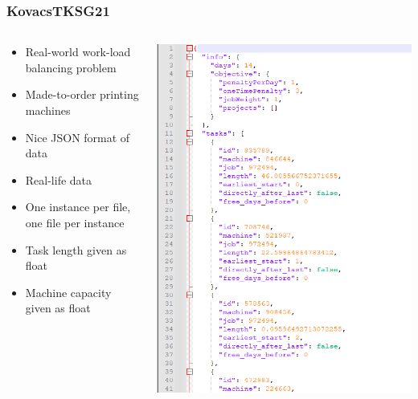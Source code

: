 \documentclass[dvipsnames,aspectratio=169]{beamer}
\begin{document}
\begin{frame}
\frametitle{KovacsTKSG21~\cite{KovacsTKSG21}}
\begin{columns}
\begin{column}{0.5\textwidth}
\begin{itemize}
\item Real-world work-load balancing problem
\item Made-to-order printing machines
\item Nice JSON format of data
\item Real-life data
\item One instance per file, one file per instance
\item Task length given as float
\item Machine capacity given as float
\end{itemize}
\end{column}
\begin{column}{0.5\textwidth}
\includegraphics[width=.7\textwidth]{images/KovacsTKSG21}
\end{column}
\end{columns}
\end{frame}
\end{document}
